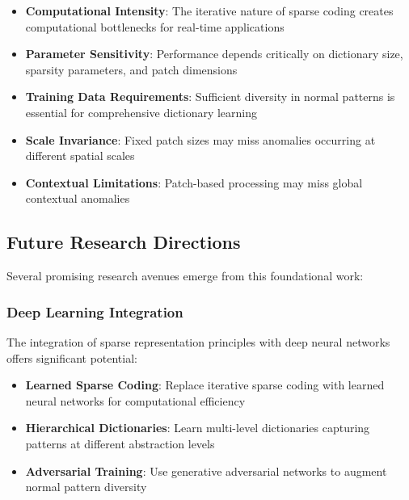 \documentclass[12pt]{article}
\begin{document}
\begin{itemize}[leftmargin=*]
    \item \textbf{Computational Intensity}: The iterative nature of sparse coding creates computational bottlenecks for real-time applications

    \item \textbf{Parameter Sensitivity}: Performance depends critically on dictionary size, sparsity parameters, and patch dimensions

    \item \textbf{Training Data Requirements}: Sufficient diversity in normal patterns is essential for comprehensive dictionary learning

    \item \textbf{Scale Invariance}: Fixed patch sizes may miss anomalies occurring at different spatial scales

    \item \textbf{Contextual Limitations}: Patch-based processing may miss global contextual anomalies
\end{itemize}

\subsection{Future Research Directions}
\label{subsec:future_directions}

Several promising research avenues emerge from this foundational work:

\subsubsection{Deep Learning Integration}
\label{subsubsec:deep_integration}

The integration of sparse representation principles with deep neural networks offers significant potential:

\begin{itemize}[leftmargin=*]
    \item \textbf{Learned Sparse Coding}: Replace iterative sparse coding with learned neural networks for computational efficiency

    \item \textbf{Hierarchical Dictionaries}: Learn multi-level dictionaries capturing patterns at different abstraction levels

    \item \textbf{Adversarial Training}: Use generative adversarial networks to augment normal pattern diversity
\end{itemize}
\end{document}
